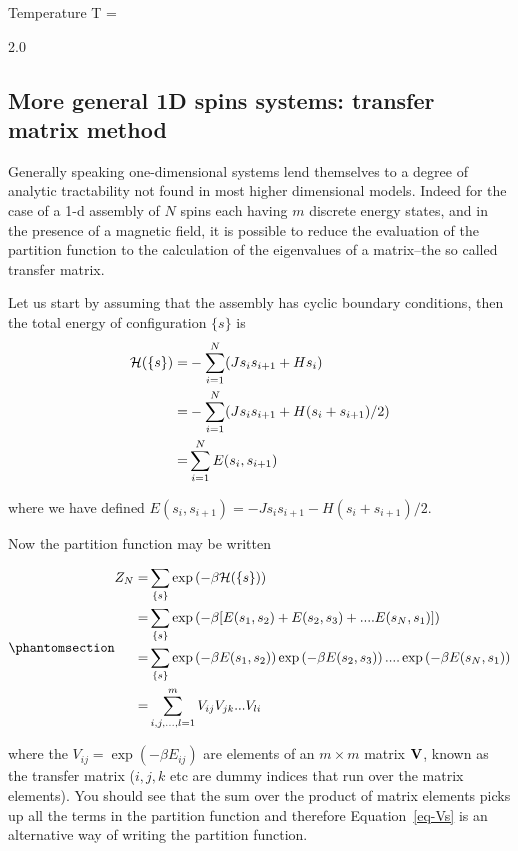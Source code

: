 \documentclass[
  letterpaper,
  DIV=11,
  numbers=noendperiod]{scrreprt}
\begin{document}
\label{ising}

Temperature T =

2.0

\subsection{More general 1D spins systems: transfer matrix
method}\label{more-general-1d-spins-systems-transfer-matrix-method}

Generally speaking one-dimensional systems lend themselves to a degree
of analytic tractability not found in most higher dimensional models.
Indeed for the case of a 1-d assembly of \(N\) spins each having \(m\)
discrete energy states, and in the presence of a magnetic field, it is
possible to reduce the evaluation of the partition function to the
calculation of the eigenvalues of a matrix--the so called transfer
matrix.

Let us start by assuming that the assembly has cyclic boundary
conditions, then the total energy of configuration \(\{s\}\) is \[
\begin{aligned}
{\cal H}(\{s\})=&-\sum_{i=1}^N (J s_i s_{i+1}+Hs_i)\\
\:=&-\sum_{i=1}^N (J s_i s_{i+1}+H(s_i+s_{i+1})/2)\\
\:=&\sum_{i=1}^N E(s_i,s_{i+1})
\end{aligned}
\]

where we have defined
\(E(s_i,s_{i+1})=-J s_i s_{i+1}-H(s_i+s_{i+1})/2\).

Now the partition function may be written

\begin{equation}\phantomsection\label{eq-Vs}{\begin{aligned}
Z_N =& \sum_{\{s\}}\exp\left(-\beta {\cal H}(\{s\})\right)\nonumber \\
 =&\sum_{\{s\}}\exp\left(-\beta[E(s_1,s_2)+E(s_2,s_3)+....E(s_N,s_1)]\right) \nonumber\\
 =&\sum_{\{s\}}\exp\left(-\beta E(s_1,s_2)\right)\exp\left(-\beta E(s_2,s_3)\right)....\exp\left(-\beta E(s_N,s_1)\right) \nonumber\\
=&\sum_{i,j,...,l=1}^m V_{ij}V_{jk}...V_{li} 
\end{aligned}}\end{equation}

where the \(V_{ij}=\exp(-\beta E_{ij})\) are elements of an
\(m \times m\) matrix \({\bf V}\), known as the transfer matrix
(\(i,j,k\) etc are dummy indices that run over the matrix elements). You
should see that the sum over the product of matrix elements picks up all
the terms in the partition function and therefore Equation~\ref{eq-Vs}
is an alternative way of writing the partition function.
\end{document}
